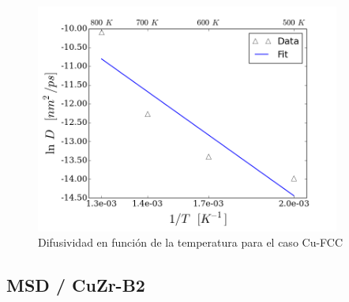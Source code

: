 \documentclass[10pt, oneside]{article} %
\begin{document}
\begin{figure}[H]
\centering
\includegraphics[width=10cm]{../Figures/Cap_4/FCCDiff_vs_temp_fit.png}
\caption[Difusividad en función de la temperatura (Cu-FCC)]{Difusividad en función de la temperatura para el caso Cu-FCC}
\label{C4:fg:FCC_diff_vs_T}
\end{figure}


\subsection{MSD / CuZr-B2}
\end{document}
